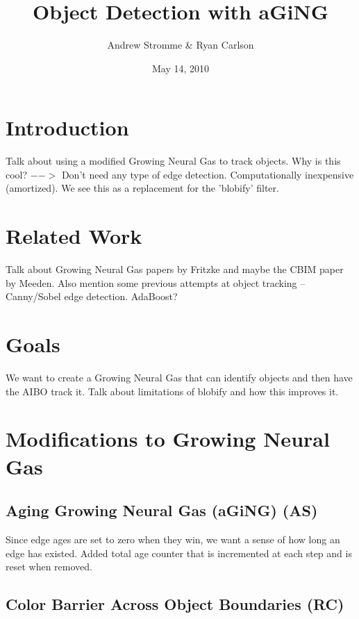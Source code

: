 \documentclass{article}
\begin{document}
\title{Object Detection with aGiNG}
\author{Andrew Stromme \& Ryan Carlson}
\date{May 14, 2010}
\maketitle

\begin{abstract}
\end{abstract}

\section{Introduction}

Talk about using a modified Growing Neural Gas to track objects. Why is this cool? $-->$ Don't need any type of edge detection. Computationally inexpensive (amortized). We see this as a replacement for the 'blobify' filter.

\section{Related Work}

Talk about Growing Neural Gas papers by Fritzke and maybe the CBIM paper by Meeden. Also mention some previous attempts at object tracking -- Canny/Sobel edge detection. AdaBoost?

\section{Goals}

We want to create a Growing Neural Gas that can identify objects and then have the AIBO track it. Talk about limitations of blobify and how this improves it.

\section{Modifications to Growing Neural Gas}

\subsection{Aging Growing Neural Gas (aGiNG) (AS)}

Since edge ages are set to zero when they win, we want a sense of how long an edge has existed. Added total age counter that is incremented at each step and is reset when removed.

\subsection{Color Barrier Across Object Boundaries (RC)}
\end{document}
